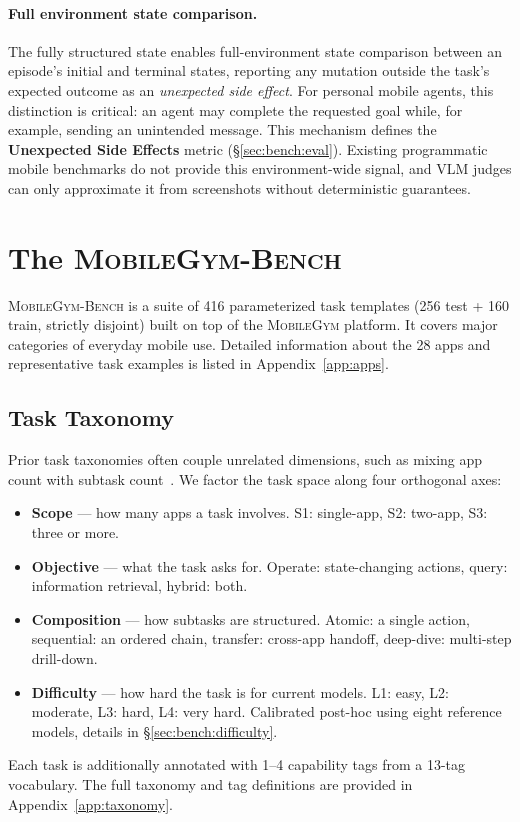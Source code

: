 \documentclass{llmxive}
\providecommand{\sys}{\textsc{MobileGym}}
\providecommand{\bench}{\textsc{MobileGym-Bench}}
\begin{document}
\paragraph{Full environment state comparison.} The fully structured state enables full-environment state comparison between an episode's initial and terminal states, reporting any mutation outside the task's expected outcome as an \emph{unexpected side effect}. For personal mobile agents, this distinction is critical: an agent may complete the requested goal while, for example, sending an unintended message. This mechanism defines the \textbf{Unexpected Side Effects} metric (§\ref{sec:bench:eval}). Existing programmatic mobile benchmarks do not provide this environment-wide signal, and VLM judges can only approximate it from screenshots without deterministic guarantees.

\section{The \bench{}}\label{sec:bench}

\bench{} is a suite of 416 parameterized task templates (256 test + 160 train, strictly disjoint) built on top of the \sys{} platform. It covers major categories of everyday mobile use.  Detailed information about the 28 apps and representative task examples is listed in Appendix~\ref{app:apps}.

\subsection{Task Taxonomy}\label{sec:bench:taxonomy}

Prior task taxonomies often couple unrelated dimensions, such as mixing app count with subtask count~\cite{MobileBench}. We factor the task space along four orthogonal axes:
\begin{itemize}
  \item \textbf{Scope} --- how many apps a task involves. S1: single-app, S2: two-app, S3: three or more.
  \item \textbf{Objective} --- what the task asks for. Operate: state-changing actions, query: information retrieval, hybrid: both.
  \item \textbf{Composition} --- how subtasks are structured. Atomic: a single action, sequential: an ordered chain, transfer: cross-app handoff, deep-dive: multi-step drill-down.
  \item \textbf{Difficulty} --- how hard the task is for current models. L1: easy, L2: moderate, L3: hard, L4: very hard. Calibrated post-hoc using eight reference models, details in §\ref{sec:bench:difficulty}.
\end{itemize}
Each task is additionally annotated with 1--4 capability tags from a 13-tag vocabulary. The full taxonomy and tag definitions are provided in Appendix~\ref{app:taxonomy}.
\end{document}
